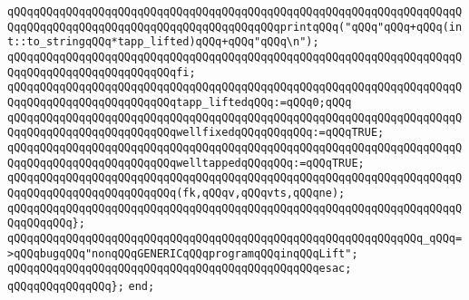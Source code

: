 \verb|qQQqqQQqqQQqqQQqqQQqqQQqqQQqqQQqqQQqqQQqqQQqqQQqqQQqqQQqqQQqqQQqqQQqqQQqqQQqqQQqqQQqqQQqqQQqqQQqqQQqqQQqqQQqqQQqprintqQQq("qQQq"qQQq+qQQq(int::to_stringqQQq*tapp_lifted)qQQq+qQQq"qQQq\n");|\newline
\verb|qQQqqQQqqQQqqQQqqQQqqQQqqQQqqQQqqQQqqQQqqQQqqQQqqQQqqQQqqQQqqQQqqQQqqQQqqQQqqQQqqQQqqQQqqQQqqQQqfi;|\newline
\newline
\verb|qQQqqQQqqQQqqQQqqQQqqQQqqQQqqQQqqQQqqQQqqQQqqQQqqQQqqQQqqQQqqQQqqQQqqQQqqQQqqQQqqQQqqQQqqQQqqQQqtapp_liftedqQQq:=qQQq0;qQQq|\newline
\verb|qQQqqQQqqQQqqQQqqQQqqQQqqQQqqQQqqQQqqQQqqQQqqQQqqQQqqQQqqQQqqQQqqQQqqQQqqQQqqQQqqQQqqQQqqQQqqQQqwellfixedqQQqqQQqqQQq:=qQQqTRUE;|\newline
\verb|qQQqqQQqqQQqqQQqqQQqqQQqqQQqqQQqqQQqqQQqqQQqqQQqqQQqqQQqqQQqqQQqqQQqqQQqqQQqqQQqqQQqqQQqqQQqqQQqwelltappedqQQqqQQq:=qQQqTRUE;|\newline
\newline
\verb|qQQqqQQqqQQqqQQqqQQqqQQqqQQqqQQqqQQqqQQqqQQqqQQqqQQqqQQqqQQqqQQqqQQqqQQqqQQqqQQqqQQqqQQqqQQqqQQq(fk,qQQqv,qQQqvts,qQQqne);|\newline
\verb|qQQqqQQqqQQqqQQqqQQqqQQqqQQqqQQqqQQqqQQqqQQqqQQqqQQqqQQqqQQqqQQqqQQqqQQqqQQqqQQq};|\newline
\newline
\verb|qQQqqQQqqQQqqQQqqQQqqQQqqQQqqQQqqQQqqQQqqQQqqQQqqQQqqQQqqQQqqQQq_qQQq=>qQQqbugqQQq"nonqQQqGENERICqQQqprogramqQQqinqQQqLift";|\newline
\verb|qQQqqQQqqQQqqQQqqQQqqQQqqQQqqQQqqQQqqQQqqQQqqQQqesac;|\newline
\verb|qQQqqQQqqQQqqQQq};|\newline
\verb|end;|\newline
\newline
\newline
\newline

